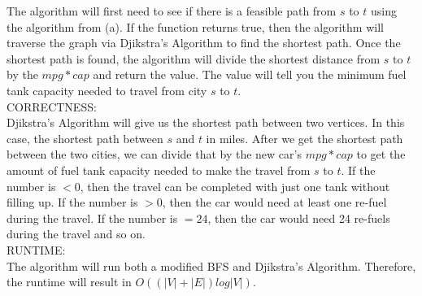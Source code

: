 \documentclass[11pt]{article}
\newenvironment{qparts}{\begin{enumerate}[{(}a{)}]}{\end{enumerate}}
\begin{document}
\begin{qparts}
The algorithm will first need to see if there is a feasible path from $s$ to $t$ using the algorithm from (a). If the function returns true, then the algorithm will traverse the graph via Djikstra's Algorithm to find the shortest path. Once the shortest path is found, the algorithm will divide the shortest distance from $s$ to $t$ by the $mpg*cap$ and return the value. The value will tell you the minimum fuel tank capacity needed to travel from city $s$ to $t$.   
\\

CORRECTNESS:\\
Djikstra's Algorithm will give us the shortest path between two vertices. In this case, the shortest path between $s$ and $t$ in miles. After we get the shortest path between the two cities, we can divide that by the new car's $mpg*cap$ to get the amount of fuel tank capacity needed to make the travel from $s$ to $t$. If the number is $< 0$, then the travel can be completed with just one tank without filling up. If the number is $> 0$, then the car would need at least one re-fuel during the travel. If the number is $= 24$, then the car would need 24 re-fuels during the travel and so on. 
\\ 

RUNTIME:\\
The algorithm will run both a modified BFS and Djikstra's Algorithm. Therefore, the runtime will result in $O((|V|+|E|)log|V|)$. 



\end{qparts}

\newpage
\end{document}
